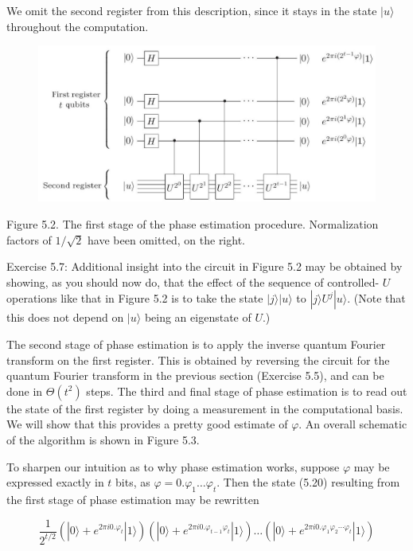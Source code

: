 We omit the second register from this description, since it stays in the state $|u\rangle$ throughout the computation.

\begin{figure}
\centering
\includegraphics[width=0.75\linewidth]{Images/2024_05_17_6977ce60de6fd27aef98g-256}
\end{figure}

Figure 5.2. The first stage of the phase estimation procedure. Normalization factors of $1 / \sqrt{2}$ have been omitted, on the right.

Exercise 5.7: Additional insight into the circuit in Figure 5.2 may be obtained by showing, as you should now do, that the effect of the sequence of controlled- $U$ operations like that in Figure 5.2 is to take the state $|j\rangle|u\rangle$ to $|j\rangle U^{j}|u\rangle$. (Note that this does not depend on $|u\rangle$ being an eigenstate of $U$.)

The second stage of phase estimation is to apply the inverse quantum Fourier transform on the first register. This is obtained by reversing the circuit for the quantum Fourier transform in the previous section (Exercise 5.5), and can be done in $\Theta\left(t^{2}\right)$ steps. The third and final stage of phase estimation is to read out the state of the first register by doing a measurement in the computational basis. We will show that this provides a pretty good estimate of $\varphi$. An overall schematic of the algorithm is shown in Figure 5.3.

To sharpen our intuition as to why phase estimation works, suppose $\varphi$ may be expressed exactly in $t$ bits, as $\varphi=0 . \varphi_{1} \ldots \varphi_{t}$. Then the state (5.20) resulting from the first stage of phase estimation may be rewritten

\begin{equation*}
\frac{1}{2^{t / 2}}\left(|0\rangle+e^{2 \pi i 0 . \varphi_{t}}|1\rangle\right)\left(|0\rangle+e^{2 \pi i 0 . \varphi_{t-1} \varphi_{t}}|1\rangle\right) \ldots\left(|0\rangle+e^{2 \pi i 0 . \varphi_{1} \varphi_{2} \cdots \varphi_{t}}|1\rangle\right) \tag{5.21}
\end{equation*}

